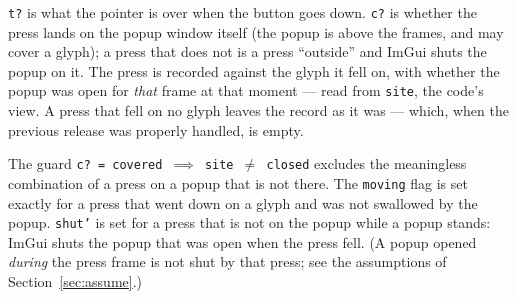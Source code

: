 \documentclass[a4paper,10pt,fleqn]{article}
\begin{document}
\texttt{t?} is what the pointer is over when the button goes down.  \texttt{c?}
is whether the press lands on the popup window itself (the popup is above the
frames, and may cover a glyph); a press that does not is a press ``outside''
and ImGui shuts the popup on it.  The press is recorded against the glyph it
fell on, with whether the popup was open for \emph{that} frame at that moment
--- read from \texttt{site}, the code's view.  A press that fell on no glyph
leaves the record as it was --- which, when the previous release was properly
handled, is empty.

The guard \texttt{c?~=~covered~$\implies$~site~$\neq$~closed} excludes the
meaningless combination of a press on a popup that is not there.  The
\texttt{moving} flag is set exactly for a press that went down on a glyph and
was not swallowed by the popup.  \texttt{shut'} is set for a press that is not
on the popup while a popup stands: ImGui shuts the popup that was open when the
press fell.  (A popup opened \emph{during} the press frame is not shut by that
press; see the assumptions of Section~\ref{sec:assume}.)
\end{document}

